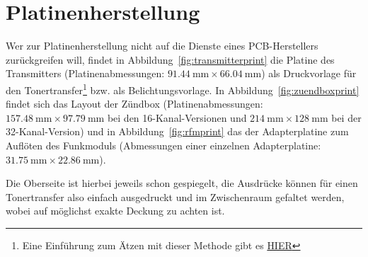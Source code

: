\documentclass[paper=a4, parskip, numbers=noenddot, toc=listof, headsepline]{scrbook}
\begin{document}
	\chapter{Platinenherstellung}
		\label{ch:platinenherstellung}

		Wer zur Platinenherstellung nicht auf die Dienste eines PCB-Herstellers zurückgreifen will, findet in Abbildung~\ref{fig:transmitterprint} die Platine des Transmitters (Platinenabmessungen: $\SI{91,44}{\milli\metre}\times\SI{66,04}{\milli\metre}$) als Druckvorlage für den Tonertransfer\footnote{Eine Einführung zum Ätzen mit dieser Methode gibt es \href{http://thomaspfeifer.net/platinen_aetzen.htm}{HIER}} bzw. als Belichtungsvorlage. In Abbildung~\ref{fig:zuendboxprint} findet sich das Layout der Zündbox (Platinenabmessungen: $\SI{157,48}{\milli\metre}\times\SI{97,79}{\milli\metre}$ bei den 16-Kanal-Versionen und $\SI{214}{\milli\metre}\times\SI{128}{\milli\metre}$ bei der 32-Kanal-Version) und in Abbildung~\ref{fig:rfmprint} das der Adapterplatine zum Auflöten des Funkmoduls (Abmessungen einer einzelnen Adapterplatine: $\SI{31,75}{\milli\metre}\times\SI{22,86}{\milli\metre}$).

		Die Oberseite ist hierbei jeweils schon gespiegelt, die Ausdrücke können für einen Tonertransfer also einfach ausgedruckt und im Zwischenraum gefaltet werden, wobei auf möglichst exakte Deckung zu achten ist.
\end{document}
